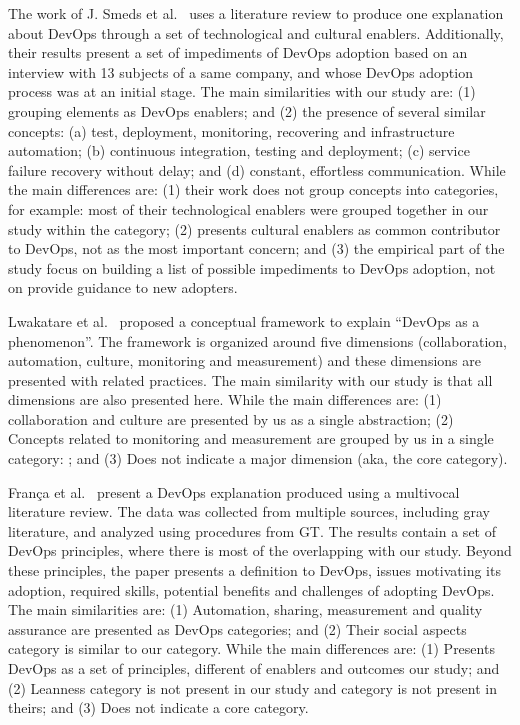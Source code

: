 The work of J. Smeds et al.~\cite{devops_a_definition_xp_15} uses a literature
review to produce one explanation about DevOps through a set of technological and
cultural enablers. Additionally, their results
present a set of impediments of DevOps adoption based on an interview with 13
subjects of a same company, and whose DevOps adoption process was at
an initial stage. The main similarities with our study are: (1) grouping
elements as DevOps enablers; and (2) the presence of several similar concepts:
(a) test, deployment, monitoring, recovering and infrastructure automation;
(b) continuous integration, testing and deployment; (c) service failure recovery
without delay; and (d) constant, effortless communication. While the main
differences are: (1) their work does not group concepts into categories,
for example: most of their technological enablers were grouped together in our
study within the  category; (2) presents cultural enablers as
common contributor to DevOps, not as the most important concern; and (3) the empirical
part of the study focus on building a list of possible impediments to DevOps
adoption, not on provide guidance to new adopters.

Lwakatare et al.~\cite{extending_dimensions_icsea_16} proposed a conceptual
framework to explain ``DevOps as a phenomenon''. The framework is organized around
five dimensions (collaboration, automation, culture, monitoring and measurement)
and these dimensions are presented with related practices. The main similarity
with our study is that all dimensions are also presented here. While the
main differences are: (1) collaboration and culture are presented by us
as a single abstraction; (2) Concepts related to monitoring and measurement are
grouped by us in a single category: ; and (3) Does
not indicate a major dimension (aka, the core category).

Fran\c{c}a et al.~\cite{characterizing_devops_sbes_2016} present a DevOps
explanation produced using a multivocal literature review. The data was collected
from multiple sources, including gray literature, and analyzed using procedures
from GT. The results contain a set of DevOps principles, where
there is most of the overlapping with our study. Beyond these principles, the paper
presents a definition to DevOps, issues motivating its adoption, required skills,
potential benefits and challenges of adopting DevOps. The main similarities
are: (1) Automation, sharing, measurement and quality assurance are presented as
DevOps categories; and (2) Their social aspects category is similar to our
\cc category. While the main differences are: (1) Presents DevOps as a
set of principles, different of enablers and outcomes our study; and (2) Leanness
category is not present in our study and  category is not present
in theirs; and (3) Does not indicate a core category.

